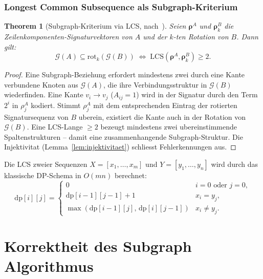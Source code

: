 ﻿\documentclass[12pt, a4paper, titlepage]{report}
\newtheorem{theorem}{Theorem}[section]
\theoremstyle{definition}
\theoremstyle{remark}
\begin{document}
\subsubsection{Longest Common Subsequence als Subgraph-Kriterium}

\begin{theorem}[Subgraph-Kriterium via LCS, nach~\citep{epp2026subgraph}]
\label{thm:lcs_kriterium}
Seien $\bm{\rho}^A$ und $\bm{\rho}^B_k$ die Zeilenkomponenten-Signaturvektoren
von $A$ und der $k$-ten Rotation von $B$. Dann gilt:
\begin{equation}
  \mathcal{G}(A) \subseteq \mathrm{rot}_k(\mathcal{G}(B))
  \;\Longleftrightarrow\;
  \mathrm{LCS}(\bm{\rho}^A, \bm{\rho}^B_k) \geq 2.
  \label{eq:lcs_kriterium}
\end{equation}
\end{theorem}

\begin{proof}
Eine Subgraph-Beziehung erfordert mindestens zwei durch eine Kante verbundene
Knoten aus $\mathcal{G}(A)$, die ihre Verbindungsstruktur in $\mathcal{G}(B)$
wiederfinden. Eine Kante $v_i \to v_j$ ($A_{ij}=1$) wird in der Signatur durch
den Term $2^i$ in $\rho_j^A$ kodiert. Stimmt $\rho_j^A$ mit dem entsprechenden
Eintrag der rotierten Signatursequenz von $B$ uberein, existiert die Kante auch
in der Rotation von $\mathcal{G}(B)$. Eine LCS-Lange $\geq 2$ bezeugt mindestens
zwei ubereinstimmende Spaltenstrukturen -- damit eine zusammenhangende Subgraph-Struktur.
Die Injektivitat (Lemma~\ref{lem:injektivitaet}) schliesst Fehlerkennungen aus.
\end{proof}

Die LCS zweier Sequenzen $X = [x_1,\ldots,x_m]$ und $Y = [y_1,\ldots,y_n]$ wird
durch das klassische DP-Schema in $O(mn)$ berechnet:
\begin{equation}
  \mathrm{dp}[i][j] = \begin{cases}
    0 & i=0 \text{ oder } j=0, \\
    \mathrm{dp}[i-1][j-1]+1 & x_i = y_j, \\
    \max(\mathrm{dp}[i-1][j],\,\mathrm{dp}[i][j-1]) & x_i \neq y_j.
  \end{cases}
  \label{eq:lcs_dp}
\end{equation}

\section{Korrektheit des Subgraph Algorithmus}
\end{document}
